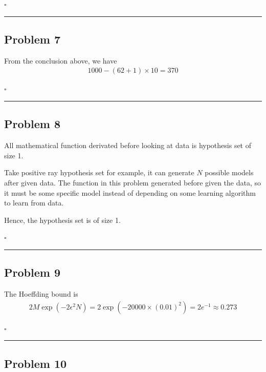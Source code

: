 \documentclass[12pt]{article}
\newcommand*{\QEDB}{\hfill\ensuremath{\square}}
\newcommand{\ParTh}[1]{\left(#1\right)}
\newcommand{\horrule}[1]{\rule{\linewidth}{#1}}
\begin{document}
\QEDB

\horrule{0.5pt}

\subsection*{Problem 7}

From the conclusion above, we have
\begin{align}
1000-\ParTh{62+1}\times10=370
\end{align}

\QEDB

\horrule{0.5pt}

\subsection*{Problem 8}

All mathematical function derivated before looking at data is hypothesis set of size 1.

Take positive ray hypothesis set for example, it can generate $N$ possible models after given data. The function in this problem generated before given the data, so it must be some specific model instead of depending on some learning algorithm to learn from data.

Hence, the hypothesis set is of size 1.

\QEDB

\horrule{0.5pt}

\subsection*{Problem 9}

The Hoeffding bound is
\begin{align}
2M\exp\ParTh{-2\epsilon^2N}=2\exp\ParTh{-20000\times\ParTh{0.01}^2}=2e^{-1}\approx0.273
\end{align}

\QEDB

\horrule{0.5pt}

\subsection*{Problem 10}
\end{document}
